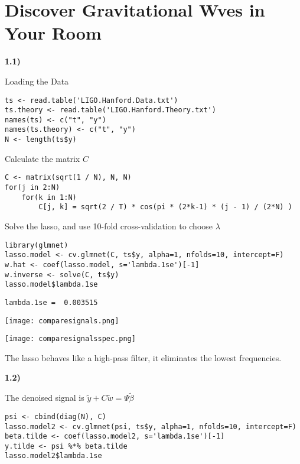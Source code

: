 \documentclass[11pt]{article}
\author{bachir el khadir}
\date{\today}
\title{}
\begin{document}
\begin{HTML}

\label{orgspecialblock1}

\end{HTML}




\section{Discover Gravitational Wves in Your Room}
\label{sec:orgheadline1}


\textbf{1.1)}

Loading the Data

\begin{verbatim}
ts <- read.table('LIGO.Hanford.Data.txt')
ts.theory <- read.table('LIGO.Hanford.Theory.txt')
names(ts) <- c("t", "y")
names(ts.theory) <- c("t", "y")
N <- length(ts$y)
\end{verbatim}




Calculate the matrix \(C\)

\begin{verbatim}
C <- matrix(sqrt(1 / N), N, N)
for(j in 2:N) 
    for(k in 1:N)
        C[j, k] = sqrt(2 / T) * cos(pi * (2*k-1) * (j - 1) / (2*N) )
\end{verbatim}


Solve the lasso, and use 10-fold cross-validation to choose \(\lambda\)

\begin{verbatim}
library(glmnet)
lasso.model <- cv.glmnet(C, ts$y, alpha=1, nfolds=10, intercept=F)
w.hat <- coef(lasso.model, s='lambda.1se')[-1]
w.inverse <- solve(C, ts$y)
lasso.model$lambda.1se
\end{verbatim}




\begin{verbatim}
lambda.1se =  0.003515
\end{verbatim}


\texttt{[image: comparesignals.png]}


\texttt{[image: comparesignalsspec.png]}

The lasso behaves like a high-pass filter, it eliminates the lowest frequencies.

\textbf{1.2)}

The denoised signal is \(\tilde y + C \tilde w = \Psi \tilde \beta\)
\begin{verbatim}
psi <- cbind(diag(N), C)
lasso.model2 <- cv.glmnet(psi, ts$y, alpha=1, nfolds=10, intercept=F)
beta.tilde <- coef(lasso.model2, s='lambda.1se')[-1]
y.tilde <- psi %*% beta.tilde
lasso.model2$lambda.1se
\end{verbatim}
\end{document}
